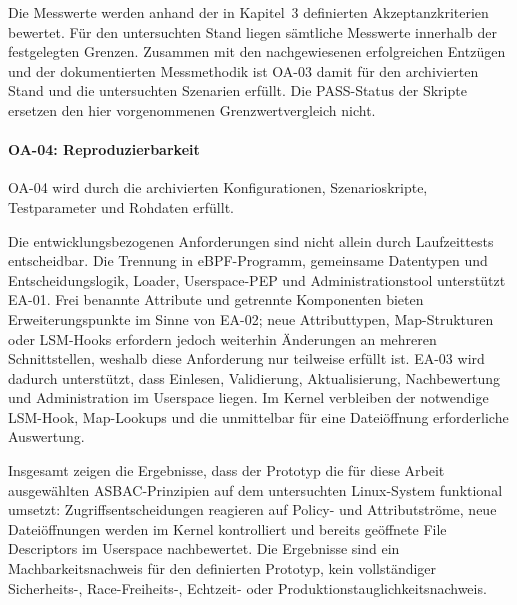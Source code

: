 Die Messwerte werden anhand der in Kapitel~3 definierten Akzeptanzkriterien bewertet.
Für den untersuchten Stand liegen sämtliche Messwerte innerhalb der festgelegten Grenzen.
Zusammen mit den nachgewiesenen erfolgreichen Entzügen und der dokumentierten Messmethodik
ist OA-03 damit für den archivierten Stand und die untersuchten Szenarien erfüllt.
Die PASS-Status der Skripte ersetzen den hier vorgenommenen Grenzwertvergleich nicht.

\paragraph{OA-04: Reproduzierbarkeit}
OA-04 wird durch die archivierten Konfigurationen,
Szenarioskripte, Testparameter und Rohdaten erfüllt.

Die entwicklungsbezogenen Anforderungen sind nicht allein durch Laufzeittests entscheidbar. Die
Trennung in eBPF-Programm, gemeinsame Datentypen und Entscheidungslogik, Loader,
Userspace-PEP und Administrationstool unterstützt EA-01. Frei benannte Attribute und getrennte
Komponenten bieten Erweiterungspunkte im Sinne von EA-02; neue Attributtypen, Map-Strukturen oder
LSM-Hooks erfordern jedoch weiterhin Änderungen an mehreren Schnittstellen, weshalb diese
Anforderung nur teilweise erfüllt ist. EA-03 wird dadurch unterstützt, dass Einlesen,
Validierung, Aktualisierung, Nachbewertung und Administration im Userspace liegen. Im Kernel
verbleiben der notwendige LSM-Hook, Map-Lookups und die unmittelbar für eine Dateiöffnung
erforderliche Auswertung.

Insgesamt zeigen die Ergebnisse, dass der Prototyp die für diese Arbeit ausgewählten
ASBAC-Prinzipien auf dem untersuchten Linux-System funktional umsetzt: Zugriffsentscheidungen
reagieren auf Policy- und Attributströme, neue Dateiöffnungen werden im Kernel kontrolliert und
bereits geöffnete File Descriptors im Userspace nachbewertet. Die Ergebnisse sind ein
Machbarkeitsnachweis für den definierten Prototyp, kein vollständiger Sicherheits-,
Race-Freiheits-, Echtzeit- oder Produktionstauglichkeitsnachweis.

\newpage
